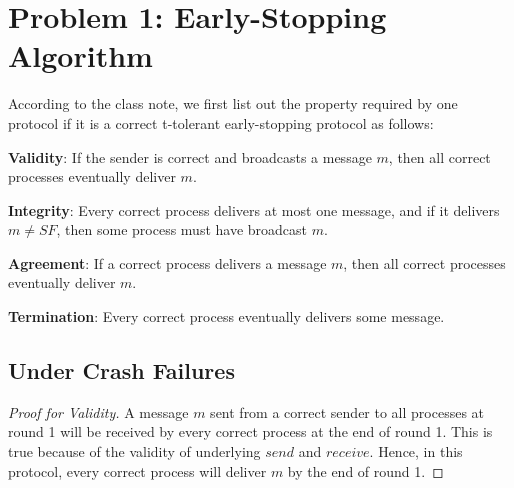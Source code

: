\documentclass[11pt,a4paper]{article}
\begin{document}
\begin{titlepage}
    \maketitle
\end{titlepage}
\renewcommand{\contentsname}{Contents}
\begin{center} 
    \tableofcontents 
\end{center}
\newpage

\section{Problem 1: Early-Stopping Algorithm}
According to the class note, we first list out the property required by one
protocol if it is a correct t-tolerant early-stopping protocol as follows:

\noindent
\textbf{Validity}: If the sender is correct and broadcasts a message $m$, then
all correct processes eventually deliver $m$.

\noindent
\textbf{Integrity}: Every correct process delivers at most one message,
and if it delivers $m \neq SF$, then some process must have broadcast $m$.

\noindent
\textbf{Agreement}: If a correct process delivers a message $m$, then all correct
processes eventually deliver $m$.

\noindent
\textbf{Termination}: Every correct process eventually delivers some message.

\subsection{Under Crash Failures}
\begin{proof}[Proof for Validity]
    A message $m$ sent from a correct sender to all processes at round 1 will be
    received by every correct process at the end of round 1. 
    This is true because of the validity of underlying $send$ and $receive$. 
    Hence, in this protocol, every correct process will deliver $m$ by the end of
    round 1. 
\end{proof}
\end{document}

